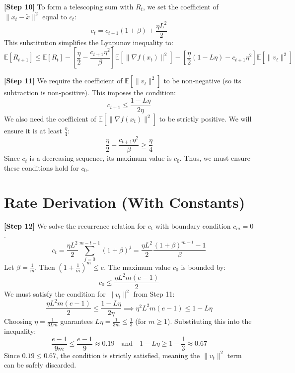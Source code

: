 \documentclass[11pt]{article}
\begin{document}
\textbf{[Step 10]} To form a telescoping sum with $R_t$, we set the coefficient of $\|x_t - \tilde{x}\|^2$ equal to $c_t$:
\begin{equation} \tag{Step 10}
    c_t = c_{t+1}(1 + \beta) + \frac{\eta L^2}{2}
\end{equation}
This substitution simplifies the Lyapunov inequality to:
\begin{equation*}
    \mathbb{E}[R_{t+1}] \le \mathbb{E}[R_t] - \left[ \frac{\eta}{2} - \frac{c_{t+1}\eta^2}{\beta} \right] \mathbb{E}[\|\nabla f(x_t)\|^2] - \left[ \frac{\eta}{2}(1 - L\eta) - c_{t+1}\eta^2 \right] \mathbb{E}[\|v_t\|^2]
\end{equation*}

\textbf{[Step 11]} We require the coefficient of $\mathbb{E}[\|v_t\|^2]$ to be non-negative (so its subtraction is non-positive). This imposes the condition:
\begin{equation} \tag{Step 11}
    c_{t+1} \le \frac{1 - L\eta}{2\eta}
\end{equation}
We also need the coefficient of $\mathbb{E}[\|\nabla f(x_t)\|^2]$ to be strictly positive. We will ensure it is at least $\frac{\eta}{4}$:
\begin{equation*}
    \frac{\eta}{2} - \frac{c_{t+1}\eta^2}{\beta} \ge \frac{\eta}{4}
\end{equation*}
Since $c_t$ is a decreasing sequence, its maximum value is $c_0$. Thus, we must ensure these conditions hold for $c_0$.

\section*{Rate Derivation (With Constants)}

\textbf{[Step 12]} We solve the recurrence relation for $c_t$ with boundary condition $c_m = 0$.
\begin{equation*}
    c_t = \frac{\eta L^2}{2} \sum_{j=0}^{m-t-1} (1+\beta)^j = \frac{\eta L^2}{2} \frac{(1+\beta)^{m-t} - 1}{\beta}
\end{equation*}
Let $\beta = \frac{1}{m}$. Then $(1+\frac{1}{m})^m \le e$. The maximum value $c_0$ is bounded by:
\begin{equation*}
    c_0 \le \frac{\eta L^2 m (e-1)}{2}
\end{equation*}
We must satisfy the condition for $\|v_t\|^2$ from Step 11:
\begin{equation*}
    \frac{\eta L^2 m (e-1)}{2} \le \frac{1 - L\eta}{2\eta} \implies \eta^2 L^2 m (e-1) \le 1 - L\eta
\end{equation*}
Choosing $\eta = \frac{1}{3Lm}$ guarantees $L\eta = \frac{1}{3m} \le \frac{1}{3}$ (for $m \ge 1$). Substituting this into the inequality:
\begin{equation} \tag{Step 12}
    \frac{e-1}{9m} \le \frac{e-1}{9} \approx 0.19 \quad \text{and} \quad 1 - L\eta \ge 1 - \frac{1}{3} \approx 0.67
\end{equation}
Since $0.19 \le 0.67$, the condition is strictly satisfied, meaning the $\|v_t\|^2$ term can be safely discarded.
\end{document}
